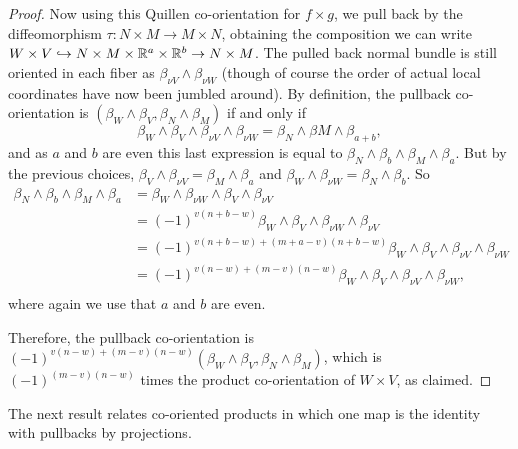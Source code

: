 \begin{proof}
Now using this Quillen co-orientation for $f\times g$,  we pull back by the diffeomorphism $\tau:N\times M\to M\times N$,  obtaining the composition we can write $W\times V\hookrightarrow N\times M\times \mathbb{R}^a\times \mathbb{R}^b\to N\times M$. The pulled back normal bundle is still oriented in each fiber as $\beta_{\nu V}\wedge \beta_{\nu W}$ (though of course the order of actual local coordinates have now been jumbled around). By definition, the pullback co-orientation is $(\beta_W\wedge \beta_V,\beta_N\wedge \beta_M)$ if and only if $$\beta_W\wedge \beta_V\wedge \beta_{\nu V}\wedge \beta_{\nu W}=\beta_N\wedge \beta M\wedge \beta_{a+b},$$
and as $a$ and $b$ are even this last expression is equal to
$\beta_N\wedge \beta_b\wedge \beta_M\wedge \beta_{a}.$ But by the previous choices, $\beta_V\wedge \beta_{\nu V}=\beta_M\wedge \beta_a$ and  $\beta_W\wedge \beta_{\nu W}=\beta_N\wedge \beta_b$. So
\begin{align*}
\beta_N\wedge \beta_b\wedge \beta_M\wedge \beta_{a}&=\beta_W\wedge \beta_{\nu W}\wedge  \beta_V\wedge \beta_{\nu V}\\
&=(-1)^{v(n+b-w)}\beta_W\wedge  \beta_V\wedge \beta_{\nu W}\wedge \beta_{\nu V}\\
&=(-1)^{v(n+b-w)+(m+a-v)(n+b-w)}\beta_W\wedge  \beta_V\wedge \beta_{\nu V}\wedge \beta_{\nu W}\\
&=(-1)^{v(n-w)+(m-v)(n-w)}\beta_W\wedge  \beta_V\wedge \beta_{\nu V}\wedge \beta_{\nu W},\\
\end{align*}
where again we use that $a$ and $b$ are even.

Therefore, the pullback co-orientation is $(-1)^{v(n-w)+(m-v)(n-w)}(\beta_W\wedge \beta_V,\beta_N \wedge \beta_M)$, which is $(-1)^{(m-v)(n-w)}$ times the product co-orientation of $W\times V$, as claimed.
\end{proof}


The next result relates co-oriented products in which one map is the identity with pullbacks by projections.

